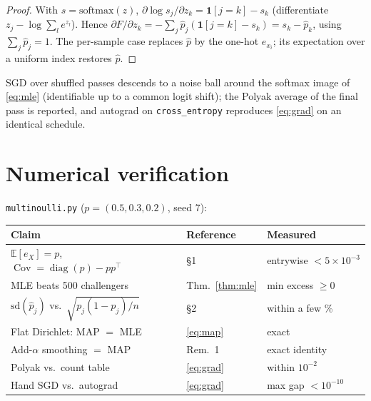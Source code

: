 \documentclass[11pt]{article}
\theoremstyle{remark}
\newcommand{\E}{\mathbb{E}}
\begin{document}
\begin{proof}
With $s = \mathrm{softmax}(z)$,
$\partial \log s_j / \partial z_k = \mathbf{1}[j{=}k] - s_k$
(differentiate $z_j - \log\sum_l e^{z_l}$). Hence
$\partial F/\partial z_k = -\sum_j \hat p_j(\mathbf{1}[j{=}k] - s_k)
= s_k - \hat p_k$, using $\sum_j \hat p_j = 1$. The per-sample case
replaces $\hat p$ by the one-hot $e_{x_i}$; its expectation over a
uniform index restores $\hat p$.
\end{proof}

SGD over shuffled passes descends to a noise ball around the softmax
image of \eqref{eq:mle} (identifiable up to a common logit shift);
the Polyak average of the final pass is reported, and autograd on
\texttt{cross\_entropy} reproduces \eqref{eq:grad} on an identical
schedule.

\section{Numerical verification}

\texttt{multinoulli.py} ($p = (0.5, 0.3, 0.2)$, seed 7):

\begin{center}
\begin{tabular}{lll}
\toprule
Claim & Reference & Measured\\
\midrule
$\E[e_X] = p$,
  $\operatorname{Cov} = \operatorname{diag}(p) - pp^{\!\top}$
  & \S1 & entrywise $< 5\times10^{-3}$\\
MLE beats 500 challengers & Thm.~\ref{thm:mle} & min excess
  $\ge 0$\\
$\mathrm{sd}(\hat p_j)$ vs.\ $\sqrt{p_j(1-p_j)/n}$ & \S2 &
  within a few \%\\
Flat Dirichlet: MAP $=$ MLE & \eqref{eq:map} & exact\\
Add-$\alpha$ smoothing $=$ MAP & Rem.~1 & exact identity\\
Polyak vs.\ count table & \eqref{eq:grad} & within $10^{-2}$\\
Hand SGD vs.\ autograd & \eqref{eq:grad} & max gap $< 10^{-10}$\\
\bottomrule
\end{tabular}
\end{center}
\end{document}
